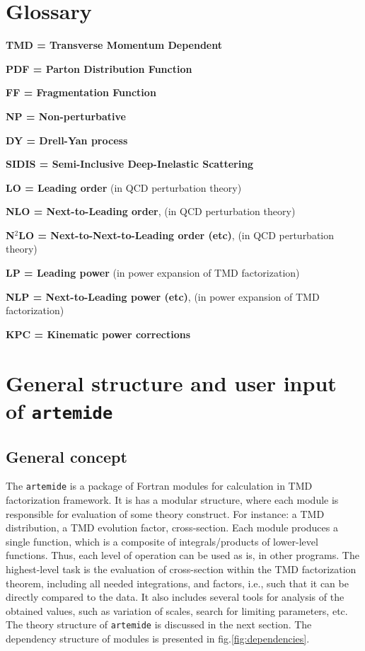 \documentclass[prd,nofootinbib,eqsecnum,final]{revtex4}
\renewcommand{\(}{\left(}
\renewcommand{\)}{\right)}
\renewcommand{\[}{\left[}
\renewcommand{\]}{\right]}
\begin{document}
\vspace*{\fill}

\clearpage

\tableofcontents

\renewcommand{\arraystretch}{1.5}


\newpage
\section*{Glossary}

\textbf{TMD = Transverse Momentum Dependent}

\textbf{PDF = Parton Distribution Function}

\textbf{FF = Fragmentation Function}

\textbf{NP = Non-perturbative}

\textbf{DY = Drell-Yan process}

\textbf{SIDIS = Semi-Inclusive Deep-Inelastic Scattering}

\textbf{LO = Leading order} (in QCD perturbation theory)

\textbf{NLO = Next-to-Leading order}, (in QCD perturbation theory)

\textbf{N$^2$LO = Next-to-Next-to-Leading order (etc)}, (in QCD perturbation theory)

\textbf{LP = Leading power} (in power expansion of TMD factorization)

\textbf{NLP = Next-to-Leading power (etc)}, (in power expansion of TMD factorization)

\textbf{KPC = Kinematic power corrections}

\newpage

\section{General structure and user input of \texttt{artemide}}

\subsection{General concept}

The \texttt{artemide} is a package of Fortran modules for calculation in TMD factorization framework. It is has a modular structure, where each module is responsible for evaluation of some theory construct. For instance: a TMD distribution, a TMD evolution factor, cross-section. Each module produces a single function, which is a composite of integrals/products of lower-level functions. Thus, each level of operation can be used as is, in other programs. The highest-level task is the evaluation of cross-section within the TMD factorization theorem, including all needed integrations, and factors, i.e., such that it can be directly compared to the data. It also includes several tools for analysis of the obtained values, such as variation of scales, search for limiting parameters, etc. The theory structure of \texttt{artemide} is discussed in the next section. The dependency structure of modules is presented in fig.\ref{fig:dependencies}.
\end{document}
